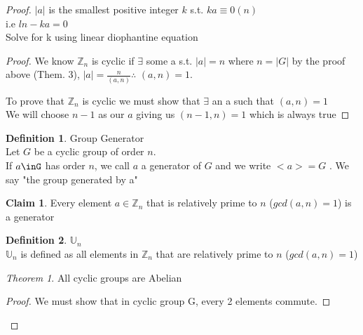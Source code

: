 \documentclass{article}
\newcounter{claim}
\theoremstyle{definition}
\newtheorem{definition}{Definition}[section]
\theoremstyle{claim}
\newtheorem{claim}{Claim}[section]
\theoremstyle{remark}
\theoremstyle{theorem}
\newtheorem{theorem}{Theorem}
\begin{document}
\begin{flushleft}
\begin{theorem}{Let a $\in  \mathbb{Z}_{n}$, then $|a| = \frac{n}{(a,n)}$\end{theorem}

\begin{proof}{$|a|$ is the smallest positive integer $k$ s.t. $ka  \equiv 0 (n)$\\i.e $ln-ka = 0$\\Solve for k using linear diophantine equation}


\begin{proof}{

We know  $\mathbb{Z}_{n}$ is cyclic if $\exists$ some a s.t. $|a| = n$ where $n = |G|$ by the proof above (Them. 3), $|a| = \frac{n}{(a,n)}$$\therefore$ $(a, n) = 1$. 

To prove that $\mathbb{Z}_{n}$ is cyclic we must show that $\exists$ an a such that $(a, n) = 1$\\We will choose $n-1$ as our $a$ giving us $(n-1, n) = 1$ which is always true}

\end{proof}

\begin{definition}{Group Generator}\\
Let $G$ be a cyclic group of order $n$.\\
If $a\inG$ has order $n$, we call $a$ a generator of $G$ and we write $<a> = G$ . We say "the group generated by a"
\end{definition}

\begin{claim}{Every element $a \in \mathbb{Z}_{n}$ that is relatively prime to $n$ ($gcd(a, n) = 1$) is a generator} \end{claim}

\begin{definition}{$\mathbb{U}_{n}$}\\
$\mathbb{U}_{n}$ is defined as all elements in $\mathbb{Z}_{n}$ that are relatively prime to $n$ ($gcd(a, n) = 1$)
\end{definition}

\begin{theorem}{All cyclic groups are Abelian}\end{theorem}
\begin{proof}{

We must show that in cyclic group G, every 2 elements commute.

}
\end{proof}
\end{proof}
\end{flushleft}
\end{document}
